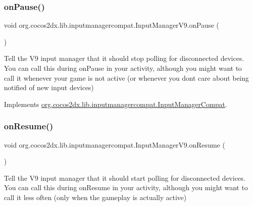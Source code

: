 \subsubsection{\texorpdfstring{on\+Pause()}{onPause()}\hspace{0.1cm}{\footnotesize\ttfamily [2/2]}}
{\footnotesize\ttfamily void org.\+cocos2dx.\+lib.\+inputmanagercompat.\+Input\+Manager\+V9.\+on\+Pause (\begin{DoxyParamCaption}{ }\end{DoxyParamCaption})\hspace{0.3cm}{\ttfamily [inline]}}

Tell the V9 input manager that it should stop polling for disconnected devices. You can call this during on\+Pause in your activity, although you might want to call it whenever your game is not active (or whenever you don\textquotesingle{}t care about being notified of new input devices) 

Implements \hyperlink{interfaceorg_1_1cocos2dx_1_1lib_1_1inputmanagercompat_1_1InputManagerCompat_a75e607a2bc756ca935665236f995dd0e}{org.\+cocos2dx.\+lib.\+inputmanagercompat.\+Input\+Manager\+Compat}.

\mbox{\label{classorg_1_1cocos2dx_1_1lib_1_1inputmanagercompat_1_1InputManagerV9_a94c18cf8110be2479e6cb8d9528b57d5}} 
\subsubsection{\texorpdfstring{on\+Resume()}{onResume()}\hspace{0.1cm}{\footnotesize\ttfamily [1/2]}}
{\footnotesize\ttfamily void org.\+cocos2dx.\+lib.\+inputmanagercompat.\+Input\+Manager\+V9.\+on\+Resume (\begin{DoxyParamCaption}{ }\end{DoxyParamCaption})\hspace{0.3cm}{\ttfamily [inline]}}

Tell the V9 input manager that it should start polling for disconnected devices. You can call this during on\+Resume in your activity, although you might want to call it less often (only when the gameplay is actually active) 

